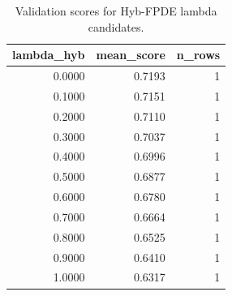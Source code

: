 \begin{table}[t]
\caption{Validation scores for Hyb-FPDE lambda candidates.}
\label{tab:lambda_distribution_computed}
\centering
\begin{tabular}{rrr}
\toprule
lambda\_hyb & mean\_score & n\_rows \\
\midrule
0.0000 & 0.7193 & 1 \\
0.1000 & 0.7151 & 1 \\
0.2000 & 0.7110 & 1 \\
0.3000 & 0.7037 & 1 \\
0.4000 & 0.6996 & 1 \\
0.5000 & 0.6877 & 1 \\
0.6000 & 0.6780 & 1 \\
0.7000 & 0.6664 & 1 \\
0.8000 & 0.6525 & 1 \\
0.9000 & 0.6410 & 1 \\
1.0000 & 0.6317 & 1 \\
\bottomrule
\end{tabular}

\end{table}

